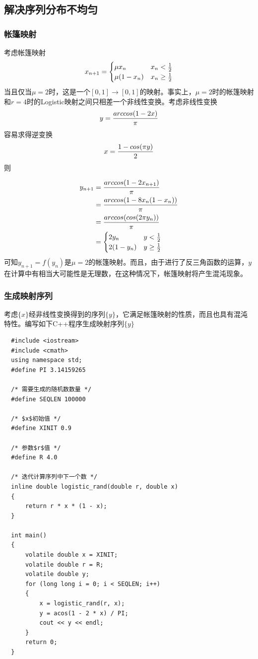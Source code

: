 \documentclass[UTF8]{ctexart}
\begin{document}
\subsection{解决序列分布不均匀}
\subsubsection{帐篷映射}
考虑帐篷映射
\[ x_{n+1}=\begin{cases} 
      \mu x_n & x_n < {1 \over 2} \\
      \mu (1-x_n) & x_n \geq {1 \over 2}
    \end{cases}
\]
当且仅当$\mu = 2$时，这是一个$[0, 1] \to [0, 1]$的映射。事实上\cite{connectiontent}，$\mu = 2$时的帐篷映射和$r=4$时的Logistic映射之间只相差一个非线性变换。考虑非线性变换
\[
{y} = {{arccos(1-2x)}\over{\pi}}
\]
容易求得逆变换
\[
{x} = {{1 - cos(\pi y)}\over{2}}
\]
则

\begin{align*} 
{y_{n+1}} &= {{arccos(1-2x_{n+1})}\over{\pi}}\\
&={{arccos(1-8x_n(1-x_n))}\over{\pi}}\\
&={{arccos(cos(2\pi y_n))}\over{\pi}}\\
&=\begin{cases}
  2y_n & y < {1\over2}\\
  2(1-y_n) & y \geq {1\over2}
  \end{cases}
\end{align*}
可知$y_{n+1}=f(y_n)$是$\mu=2$的帐篷映射。而且，由于进行了反三角函数的运算，$y$在计算中有相当大可能性是无理数，在这种情况下，帐篷映射将产生混沌现象。

\subsubsection{生成映射序列}
考虑$\{x\}$经非线性变换得到的序列$\{y\}$，它满足帐篷映射的性质，而且也具有混沌特性。编写如下C++程序生成映射序列$\{y\}$

\begin{verbatim}
  #include <iostream>
  #include <cmath>
  using namespace std;
  #define PI 3.14159265
  
  /* 需要生成的随机数数量 */
  #define SEQLEN 100000
  
  /* $x$初始值 */
  #define XINIT 0.9
  
  /* 参数$r$值 */
  #define R 4.0 
  
  /* 迭代计算序列中下一个数 */
  inline double logistic_rand(double r, double x)
  {
      return r * x * (1 - x);
  }
  
  int main()
  {
      volatile double x = XINIT;
      volatile double r = R;
      volatile double y;
      for (long long i = 0; i < SEQLEN; i++)
      {
          x = logistic_rand(r, x);
          y = acos(1 - 2 * x) / PI;
          cout << y << endl;
      }
      return 0;
  }
\end{verbatim}
\end{document}
